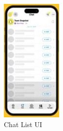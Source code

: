 \documentclass{article}
\begin{document}
\newpage
\begin{figure}[h]
    \begin{minipage}{0.15\textwidth} 
        \includegraphics[width=\linewidth]{chatlist.jpg}
        \caption{Chat List UI}

\end{minipage}
\end{figure}
\end{document}
